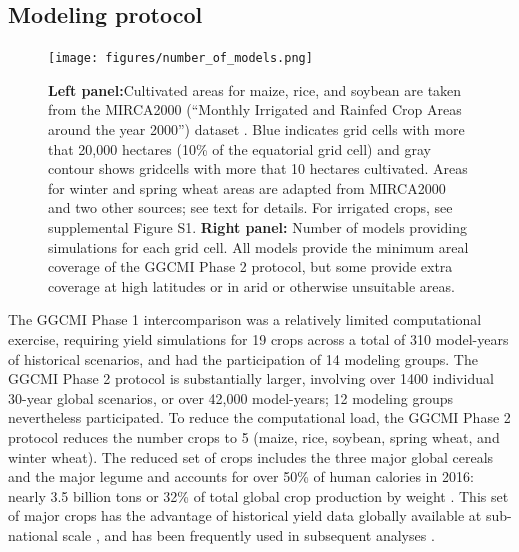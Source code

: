 \documentclass[gmd, manuscript]{copernicus} %
\begin{document}
\subsection{Modeling protocol}
\begin{figure}[ht]
  \centering
  \texttt{[image: figures/number\_of\_models.png]}
  \caption{
  \textbf{Left panel:}Cultivated areas for maize, rice, and soybean are taken from the MIRCA2000 (``Monthly Irrigated and Rainfed Crop Areas around the year 2000'') dataset \citep{Portmann2010}. Blue indicates grid cells with more that 20,000 hectares (10\% of the equatorial grid cell) and gray contour shows gridcells with more that 10 hectares cultivated. 
  Areas for winter and spring wheat areas are adapted from MIRCA2000 and two other sources; see text for details.  For irrigated crops, see supplemental Figure S1.
  \textbf{Right panel:} Number of models providing simulations for each grid cell.  
  All models provide the minimum areal coverage of the GGCMI Phase 2 protocol, but some provide extra coverage at high latitudes or in arid or otherwise unsuitable areas.}
  \label{fig:crop_area}
\end{figure}

The GGCMI Phase 1 intercomparison was a relatively limited computational exercise, requiring yield simulations for 19 crops across a total of 310 model-years of historical scenarios, and had the participation of 14 modeling groups.
The GGCMI Phase 2 protocol is substantially larger, involving over 1400 individual 30-year global scenarios, or over 42,000 model-years; 12 modeling groups nevertheless participated. To reduce the computational load, the GGCMI Phase 2 protocol reduces the number crops to 5 (maize, rice, soybean, spring wheat, and winter wheat). 
The reduced set of crops includes the three major global cereals and the major legume and accounts for over 50\% of human calories in 2016: nearly 3.5 billion tons or 32\% of total global crop production by weight \citep{FAOSTAT}. 
This set of major crops has the advantage of historical yield data globally available at sub-national scale \citep{Ray2012,Iizumi_historical_2014}, and has been frequently used in subsequent analyses \citep[e.g.][]{muller_global_2017,porwollik_spatial_2016}.
\end{document}
